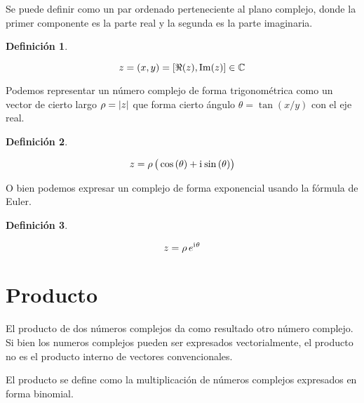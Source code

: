 \documentclass[a5paper,12pt,twoside]{book}
\newtheorem{defn}{{Definición}}[chapter]
\begin{document}
Se puede definir como un par ordenado perteneciente al plano complejo, donde la primer componente es la parte real y la segunda es la parte imaginaria.

\begin{mdframed}[style=MyFrame1]
    \begin{defn}
        \label{defn:VectorForm}
    \end{defn}
    \begin{equation*}
        z = (x,y) = \left[\Re(z),\operatorname{Im}(z)\right] \in \mathbb{C}
    \end{equation*}
\end{mdframed}

Podemos representar un número complejo de forma trigonométrica como un vector de cierto largo $\rho={\left| {z} \right|}$ que forma cierto ángulo $\theta = \tan{(x/y)}$ con el eje real.

\begin{mdframed}[style=MyFrame1]
    \begin{defn}
        \label{defn:TrigForm}
    \end{defn}
    \begin{equation*}
        z = \rho \, \big( \cos{(\theta)} + \mathrm{i}\mkern1mu \sin{(\theta)} \big)
    \end{equation*}
\end{mdframed}

O bien podemos expresar un complejo de forma exponencial usando la fórmula de Euler.

\begin{mdframed}[style=MyFrame1]
    \begin{defn}
        \label{defn:ExpForm}
    \end{defn}
    \begin{equation*}
        z = \rho \, e^{\mathrm{i}\mkern1mu \theta}
    \end{equation*}
\end{mdframed}


\section{Producto}

El producto de dos números complejos da como resultado otro número complejo. Si bien los numeros complejos pueden ser expresados vectorialmente, el producto no es el producto interno de vectores convencionales.

El producto se define como la multiplicación de números complejos expresados en forma binomial.
\end{document}
